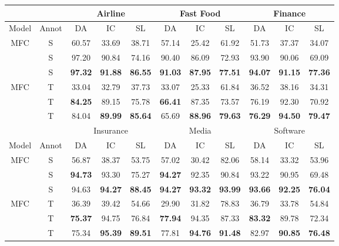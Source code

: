 {{\begin{table*}[t!]
\begin{tabular}{ c c  c c c  c c c  c c c }
		& & \multicolumn{3}{c}{Airline} & \multicolumn{3}{c}{Fast Food} & \multicolumn{3}{c}{Finance}   \\
		\hline
		Model & Annot & DA & IC & SL & DA & IC & SL & DA & IC & SL \\
		\hline
		MFC & S & 60.57 & 33.69 &	38.71 &	57.14 &	25.42 &	61.92 &	51.73 &	37.37 &	34.07 \\
		\lstm & S & 97.20 & 90.84 &	74.16 &	90.40 &	86.09 &	72.93 &	93.90 &	90.06 &	69.09 \\
		\elmo & S & \cellcolor{red!25}\textbf{97.32} & \cellcolor{red!25}\textbf{91.88} & \cellcolor{red!25}\textbf{86.55} & \cellcolor{red!25}\textbf{91.03} & \textbf{87.95} & \textbf{77.51} & \cellcolor{red!25}\textbf{94.07} & \textbf{91.15} & \textbf{77.36} \\
		\hline
		MFC & T & 33.04 & 32.79 &	37.73 &	33.07 &	25.33 &	61.84 &	36.52 &	38.16 &	34.31 \\
		\lstm & T & \textbf{84.25} & 89.15 &	75.78 &	\textbf{66.41} &	87.35 &	73.57 &	76.19 &	92.30 &	70.92 \\
		\elmo & T & 84.04 & \textbf{89.99} &	\textbf{85.64} &	65.69 &	\cellcolor{red!25}\textbf{88.96} &	\cellcolor{red!25}\textbf{79.63} &	\textbf{76.29} &	\cellcolor{red!25}\textbf{94.50} &	\cellcolor{red!25}\textbf{79.47} \\
		\hline
		& & \multicolumn{3}{c}{Insurance} & \multicolumn{3}{c}{Media} & \multicolumn{3}{c}{Software} \\
		\hline
		Model & Annot & DA & IC & SL & DA & IC & SL & DA & IC & SL \\
		\hline
		MFC & S & 56.87 &	38.37 &	53.75 &	57.02 &	30.42 &	82.06 &	58.14 &	33.32 &	53.96 \\
		\lstm & S & \cellcolor{red!25}\textbf{94.73} &	93.30 &	75.27 &	\cellcolor{red!25}\textbf{94.27} &	92.35 &	90.84 &	93.22 &	90.95 &	69.48 \\
		\elmo & S & 94.63 &	\textbf{94.27} &	\textbf{88.45} &	\cellcolor{red!25}\textbf{94.27} &	\textbf{93.32} &	\cellcolor{red!25}\textbf{93.99} &	\cellcolor{red!25}\textbf{93.66} &	\cellcolor{red!25}\textbf{92.25} &	\textbf{76.04} \\
		\hline       
		MFC & T & 36.39 &	39.42 &	54.66 &	29.90 &	31.82 &	78.83 &	36.79 &	33.78 &	54.84 \\
		\lstm & T & \textbf{75.37} &	94.75 &	76.84 &	\textbf{77.94} &	94.35 &	87.33 &	\textbf{83.32} &	89.78 &	72.34 \\
		\elmo & T & 75.34 &	\cellcolor{red!25}\textbf{95.39} &	\cellcolor{red!25}\textbf{89.51} &	77.81 &	\cellcolor{red!25}\textbf{94.76} &	\textbf{91.48} &	82.97 &	\textbf{90.85} &	\cellcolor{red!25}\textbf{76.48} \\

\end{tabular}
\end{table*}}}
